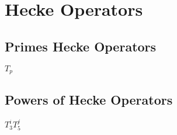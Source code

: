 \section{Hecke Operators}
\subsection{Primes Hecke Operators}
$T_p$

\subsection{Powers of Hecke Operators}
$T_3^iT_5^j$
